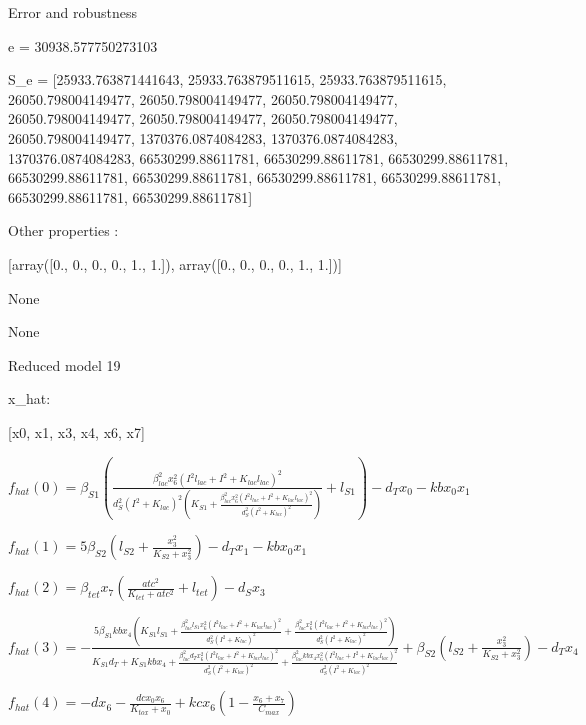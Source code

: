 Error and robustness 


e = 30938.577750273103

S_e = [25933.763871441643, 25933.763879511615, 25933.763879511615, 26050.798004149477, 26050.798004149477, 26050.798004149477, 26050.798004149477, 26050.798004149477, 26050.798004149477, 26050.798004149477, 1370376.0874084283, 1370376.0874084283, 1370376.0874084283, 66530299.88611781, 66530299.88611781, 66530299.88611781, 66530299.88611781, 66530299.88611781, 66530299.88611781, 66530299.88611781, 66530299.88611781, 66530299.88611781]

Other properties :


[array([0., 0., 0., 0., 1., 1.]), array([0., 0., 0., 0., 1., 1.])]

None

None

Reduced model 19

x_{hat}: 

[x0, x1, x3, x4, x6, x7]


$f_{hat}(0)=\beta_{S1} \left(\frac{\beta_{lac}^{2} x_{6}^{2} \left(I^{2} l_{lac} + I^{2} + K_{lac} l_{lac}\right)^{2}}{d_{S}^{2} \left(I^{2} + K_{lac}\right)^{2} \left(K_{S1} + \frac{\beta_{lac}^{2} x_{6}^{2} \left(I^{2} l_{lac} + I^{2} + K_{lac} l_{lac}\right)^{2}}{d_{S}^{2} \left(I^{2} + K_{lac}\right)^{2}}\right)} + l_{S1}\right) - d_{T} x_{0} - kb x_{0} x_{1}$


$f_{hat}(1)=5 \beta_{S2} \left(l_{S2} + \frac{x_{3}^{2}}{K_{S2} + x_{3}^{2}}\right) - d_{T} x_{1} - kb x_{0} x_{1}$


$f_{hat}(2)=\beta_{tet} x_{7} \left(\frac{atc^{2}}{K_{tet} + atc^{2}} + l_{tet}\right) - d_{S} x_{3}$


$f_{hat}(3)=- \frac{5 \beta_{S1} kb x_{4} \left(K_{S1} l_{S1} + \frac{\beta_{lac}^{2} l_{S1} x_{6}^{2} \left(I^{2} l_{lac} + I^{2} + K_{lac} l_{lac}\right)^{2}}{d_{S}^{2} \left(I^{2} + K_{lac}\right)^{2}} + \frac{\beta_{lac}^{2} x_{6}^{2} \left(I^{2} l_{lac} + I^{2} + K_{lac} l_{lac}\right)^{2}}{d_{S}^{2} \left(I^{2} + K_{lac}\right)^{2}}\right)}{K_{S1} d_{T} + K_{S1} kb x_{4} + \frac{\beta_{lac}^{2} d_{T} x_{6}^{2} \left(I^{2} l_{lac} + I^{2} + K_{lac} l_{lac}\right)^{2}}{d_{S}^{2} \left(I^{2} + K_{lac}\right)^{2}} + \frac{\beta_{lac}^{2} kb x_{4} x_{6}^{2} \left(I^{2} l_{lac} + I^{2} + K_{lac} l_{lac}\right)^{2}}{d_{S}^{2} \left(I^{2} + K_{lac}\right)^{2}}} + \beta_{S2} \left(l_{S2} + \frac{x_{3}^{2}}{K_{S2} + x_{3}^{2}}\right) - d_{T} x_{4}$


$f_{hat}(4)=- d x_{6} - \frac{dc x_{0} x_{6}}{K_{tox} + x_{0}} + kc x_{6} \left(1 - \frac{x_{6} + x_{7}}{C_{max}}\right)$


